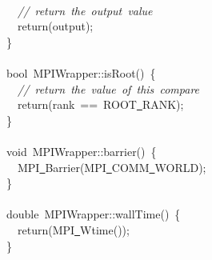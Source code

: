 {$$\ \\
\ \ \textsl{//\ return\ the\ output\ value}\\
\ \ return(output);\\
\}\\
\ \\
bool\ MPIWrapper::isRoot()\ \{\\
\ \ \textsl{//\ return\ the\ value\ of\ this\ compare}\\
\ \ return(rank\ ==\ ROOT\underline\ RANK);\\
\}\\
\ \\
void\ MPIWrapper::barrier()\ \{\\
\ \ MPI\underline\ Barrier(MPI\underline\ COMM\underline\ WORLD);\\
\}\\
\ \\
double\ MPIWrapper::wallTime()\ \{\\
\ \ return(MPI\underline\ Wtime());\\
\}\\
\ \\
 }
\normalfont\normalsize

